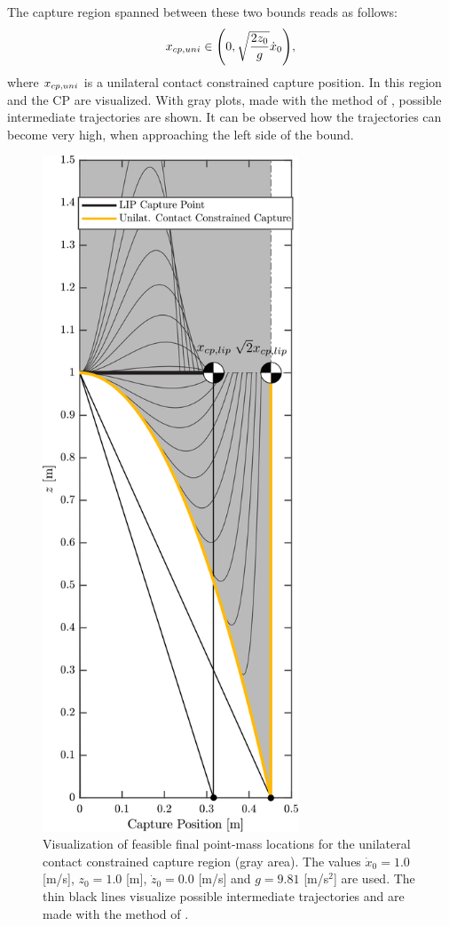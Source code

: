 The capture region spanned between these two bounds reads as follows:
\begin{equation}
x_{cp,uni} \in \Bigg(0, \sqrt{\frac{2z_0}{g}}\dot{x}_0 \Bigg),
\label{eq:xcpuni}
\end{equation}
where $x_{cp,uni}$ is a unilateral contact constrained capture position. In  this region and the \ac{CP} are visualized. With gray plots, made with the method of \cite{koolen2016balance}, possible intermediate trajectories are shown. It can be observed how the trajectories can become very high, when approaching the left side of the bound.  

\begin{figure}
\centering
\includegraphics[width=3.0in]{STYLESTUFF/CPvsBalistic4.png}
\caption{Visualization of feasible final point-mass locations for the unilateral contact constrained capture region (gray area). The values $\dot{x}_0=1.0$ [m/s], $z_0=1.0$ [m], $\dot{z}_0=0.0$ [m/s] and $g=9.81$ [m/s$^2$] are used. The thin black lines visualize possible intermediate trajectories and are made with the method of \cite{koolen2016balance}.}
\label{fig:cpbal}
\end{figure}

